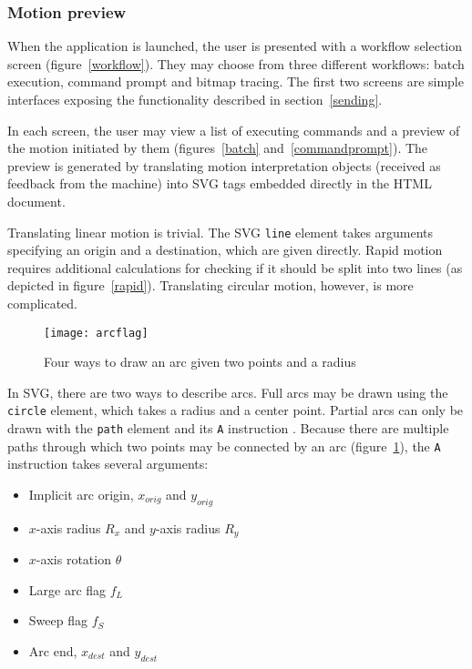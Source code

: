 \clearpage
\subsubsection{Motion preview}

When the application is launched, the user is presented with a workflow
selection screen (figure~\ref{workflow}). They may choose from three different
workflows: batch execution, command prompt and bitmap tracing. The first two
screens are simple interfaces exposing the functionality described in
section~\ref{sending}.

In each screen, the user may view a list of executing commands and a preview
of the motion initiated by them (figures~\ref{batch} and~\ref{commandprompt}).
The preview is generated by translating motion interpretation objects
(received as feedback from the machine) into SVG tags embedded directly in the
HTML document.

Translating linear motion is trivial. The SVG \texttt{line} element takes
arguments specifying an origin and a destination, which are given directly.
Rapid motion requires additional calculations for checking if it should be
split into two lines (as depicted in figure~\ref{rapid}). Translating circular
motion, however, is more complicated.

\begin{figure}[ht]
    \begin{center}
        \texttt{[image: arcflag]}
        \caption{Four ways to draw an arc given two points and a radius}
        \label{arcflag}
    \end{center}
\end{figure}

In SVG, there are two ways to describe arcs. Full arcs may be drawn using the
\texttt{circle} element, which takes a radius and a center point. Partial
arcs can only be drawn with the \texttt{path} element and its \texttt{A}
instruction \cite{circles}. Because there are multiple paths through which two
points may be connected by an arc (figure~\ref{arcflag}), the \texttt{A}
instruction takes several arguments:

\begin{itemize}
    \item Implicit arc origin, $x_{orig}$ and $y_{orig}$
    \item $x$-axis radius $R_x$ and $y$-axis radius $R_y$
    \item $x$-axis rotation $\theta$
    \item Large arc flag $f_L$
    \item Sweep flag $f_S$
    \item Arc end, $x_{dest}$ and $y_{dest}$
\end{itemize}

